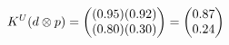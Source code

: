 \documentclass[preview]{standalone}
\begin{document}
\begin{align*}
\special{dvisvgm:raw <g id='unique000'>}K^U(d \otimes p) = \begin{pmatrix} (0.95)(0.92) \\ (0.80)(0.30) \end{pmatrix} = \begin{pmatrix} 0.87 \\ 0.24 \end{pmatrix}\special{dvisvgm:raw </g>}
\end{align*}
\end{document}
